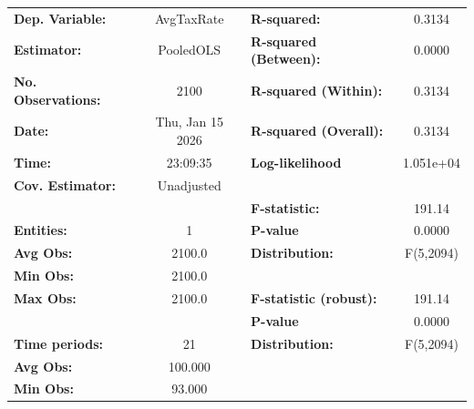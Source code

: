 \begin{center}
\begin{tabular}{lclc}
\toprule
\textbf{Dep. Variable:}                          &     AvgTaxRate     & \textbf{  R-squared:         }   &      0.3134      \\
\textbf{Estimator:}                              &     PooledOLS      & \textbf{  R-squared (Between):}  &      0.0000      \\
\textbf{No. Observations:}                       &        2100        & \textbf{  R-squared (Within):}   &      0.3134      \\
\textbf{Date:}                                   &  Thu, Jan 15 2026  & \textbf{  R-squared (Overall):}  &      0.3134      \\
\textbf{Time:}                                   &      23:09:35      & \textbf{  Log-likelihood     }   &    1.051e+04     \\
\textbf{Cov. Estimator:}                         &     Unadjusted     & \textbf{                     }   &                  \\
\textbf{}                                        &                    & \textbf{  F-statistic:       }   &      191.14      \\
\textbf{Entities:}                               &         1          & \textbf{  P-value            }   &      0.0000      \\
\textbf{Avg Obs:}                                &       2100.0       & \textbf{  Distribution:      }   &    F(5,2094)     \\
\textbf{Min Obs:}                                &       2100.0       & \textbf{                     }   &                  \\
\textbf{Max Obs:}                                &       2100.0       & \textbf{  F-statistic (robust):} &      191.14      \\
\textbf{}                                        &                    & \textbf{  P-value            }   &      0.0000      \\
\textbf{Time periods:}                           &         21         & \textbf{  Distribution:      }   &    F(5,2094)     \\
\textbf{Avg Obs:}                                &      100.000       & \textbf{                     }   &                  \\
\textbf{Min Obs:}                                &       93.000       & \textbf{                     }   &                  \\

\end{tabular}
\end{center}
